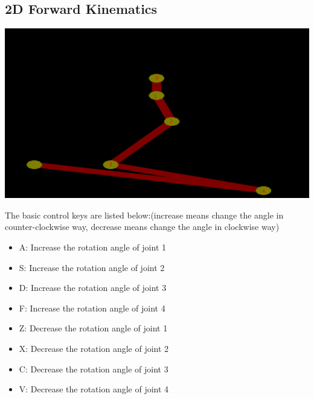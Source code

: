 \documentclass[a4paper, 11pt]{article}
\begin{document}
    \subsection{2D Forward Kinematics}
        \begin{center}
            \includegraphics[width = \textwidth]{Capture0.PNG}
        \end{center}
        The basic control keys are listed below:(increase means change the angle in counter-clockwise way, decrease means change the angle in clockwise way)
        \begin{itemize}
            \item A: Increase the rotation angle of joint 1
            \item S: Increase the rotation angle of joint 2
            \item D: Increase the rotation angle of joint 3
            \item F: Increase the rotation angle of joint 4
            \item Z: Decrease the rotation angle of joint 1
            \item X: Decrease the rotation angle of joint 2
            \item C: Decrease the rotation angle of joint 3
            \item V: Decrease the rotation angle of joint 4
        \end{itemize}
\end{document}
